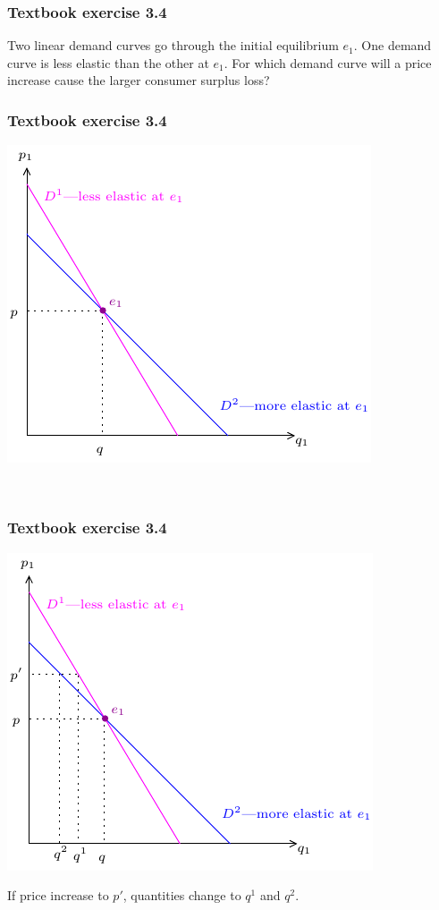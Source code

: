 \documentclass[xcolor=pdftex,dvipsnames]{beamer}
\begin{document}
\begin{frame}
\frametitle{Textbook exercise  3.4}
Two linear demand curves go through the initial equilibrium $e_1$. One
demand curve is less elastic   than the other at $e_1$. For which
demand curve will a price increase cause the larger consumer surplus
loss?
\bigskip

\end{frame}

\begin{frame}
\frametitle{Textbook exercise 3.4}
\begin{center}\includegraphics{pics/Exercise3}\end{center}
\bigskip

\
\end{frame}
\begin{frame}
\frametitle{Textbook exercise 3.4}
\begin{center}\includegraphics{pics/Exercise31}\end{center}
If price increase to $p'$, quantities change to $q^1$ and $q^2$.
\end{frame}
\end{document}
